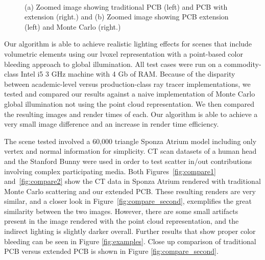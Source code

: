 \documentclass[runningheads]{llncs}
\begin{document}
\begin{figure}
\centering

\\
    \caption{(a) Zoomed image showing traditional PCB (left) and PCB with extension (right.) and (b) Zoomed image showing PCB extension (left) and Monte Carlo (right.)}
\end{figure}

Our algorithm is able to achieve realistic lighting effects for scenes that include volumetric elements using our lvoxel representation with a point-based color bleeding approach to global illumination.
All test cases were run on a commodity-class Intel i5 3 GHz machine with 4 Gb of RAM.  Because of the disparity between academic-level versus production-class ray tracer implementations, we tested and compared our results against a naive implementation of Monte Carlo global illumination not using the point cloud representation.  We then compared the resulting images and render times of each.  Our algorithm is able to achieve a very small image difference and an increase in render time efficiency.

The scene tested involved a 60,000 triangle Sponza Atrium model including only vertex and normal information for simplicity.  CT scan datasets of a human head and the Stanford Bunny were used in order to test scatter in/out contributions involving complex participating media.
Both Figures~\ref{fig:compare1} and~\ref{fig:compare2} show the CT data in Sponza Atrium rendered with traditional Monte Carlo scattering and our extended PCB.  These resulting renders are very similar, and a closer look in Figure~\ref{fig:compare_second}, exemplifies the great similarity between the two images.  However, there are some small artifacts present in the image rendered with the point cloud representation, and the indirect lighting is slightly darker overall.  Further results that show proper color bleeding can be seen in Figure \ref{fig:examples}.  Close up comparison of traditional PCB versus extended PCB is shown in Figure \ref{fig:compare_second}.
\end{document}

